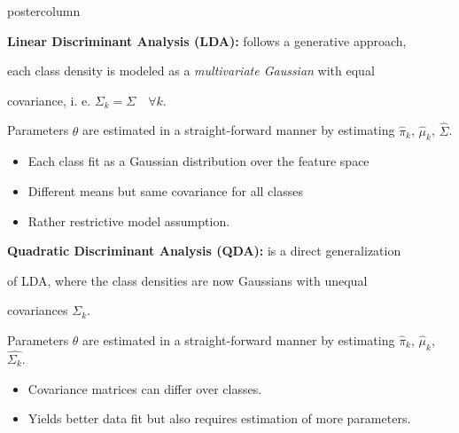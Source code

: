 \documentclass{beamer}
\begin{document}
\begin{frame}[fragile]{}
\begin{columns}
\begin{column}{.31\textwidth}
\begin{beamercolorbox}[center]{postercolumn}
\begin{minipage}{.98\textwidth}
{\begin{myblock}{}
  \vspace*{1ex}
  
  \begin{codebox}
  \textbf{Linear Discriminant Analysis (LDA): }follows a generative approach,
  \end{codebox}
  
  \begin{codebox}
  each class density is modeled as a \emph{multivariate Gaussian} with equal
  \end{codebox}
  
  \begin{codebox}
  covariance, i. e. $\Sigma_k = \Sigma \quad \forall k$.
  \end{codebox}
  
  \hspace*{1ex}Parameters $\theta$ are estimated in a straight-forward manner by estimating \hspace*{1ex}$\hat{\pi}_k$, $\hat{\mu}_k$, $\hat{\Sigma}$.
  
  \begin{itemize}[$\bullet$]     
  \setlength{\itemindent}{+.3in}
      \item Each class fit as a Gaussian distribution over the feature space
      \item Different means but same covariance for all classes
      \item Rather restrictive model assumption.
  \end{itemize}

  \vspace*{1ex}

  \begin{codebox}
  \textbf{Quadratic Discriminant Analysis (QDA): }is a direct generalization
  \end{codebox}
  
  \begin{codebox}
  of LDA, where the class densities are now Gaussians with unequal 
  \end{codebox}
  
  \begin{codebox}
  covariances $\Sigma_k$.
  \end{codebox}
  
  \hspace*{1ex}Parameters $\theta$ are estimated in a straight-forward manner by estimating \hspace*{1ex}$\hat{\pi}_k$, $\hat{\mu}_k$, $\hat{\Sigma_k}$.
  
  \begin{itemize}[$\bullet$]     
  \setlength{\itemindent}{+.3in}
      \item Covariance matrices can differ over classes.
      \item Yields better data fit but also requires estimation of more parameters.
  \end{itemize}
  

\end{myblock}}
\end{minipage}
\end{beamercolorbox}
\end{column}
\end{columns}
\end{frame}
\end{document}
